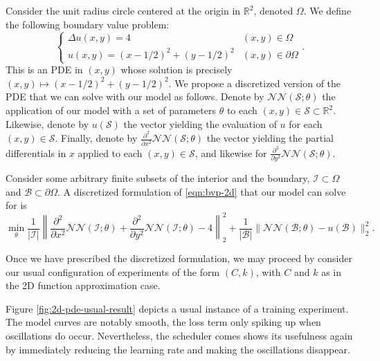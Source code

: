 \documentclass[12pt]{report} %
\begin{document}
Consider the unit radius circle centered at the origin in $\mathbb{R}^2$,
denoted $\Omega$. We define the following boundary value problem:
\begin{equation}
  \left\{\begin{array}{ll}
    \Delta u (x, y) = 4                      & (x, y) \in \Omega          \\
    u (x, y) = (x - 1 / 2)^2 + (y - 1 / 2)^2 & (x, y) \in \partial \Omega
  \end{array}\right. . \label{eqn:bvp-2d}
\end{equation}
This is an PDE in $(x, y)$ whose solution is precisely $(x, y) \mapsto (x - 1
  / 2)^2 + (y - 1 / 2)^2$. We propose a discretized version of the PDE that we
can solve with our model as follows. Denote by $\mathcal{N}\mathcal{N}
  (\mathcal{S}; \theta)$ the application of our model with a set of parameters
$\theta$ to each $(x, y) \in \mathcal{S} \subset \mathbb{R}^2$. Likewise,
denote by $u (\mathcal{S})$ the vector yielding the evaluation of $u$ for each
$(x, y) \in \mathcal{S}$. Finally, denote by $\frac{\partial^2}{\partial x^2}
  \mathcal{N}\mathcal{N} (\mathcal{S}; \theta)$ the vector yielding the partial
differentials in $x$ applied to each $(x, y) \in \mathcal{S}$, and likewise
for $\frac{\partial^2}{\partial y^2} \mathcal{N}\mathcal{N} (\mathcal{S};
  \theta)$.

Consider some arbitrary finite subsets of the interior and the boundary,
$\mathcal{I} \subset \Omega$ and $\mathcal{B} \subset \partial \Omega$. A
discretized formulation of \eqref{eqn:bvp-2d} that our model can solve for is
\[ \min_{\theta} \frac{1}{| \mathcal{I} |} \left\| \frac{\partial^2}{\partial
    x^2} \mathcal{N}\mathcal{N} (\mathcal{I}; \theta) +
  \frac{\partial^2}{\partial y^2} \mathcal{N}\mathcal{N} (\mathcal{I};
  \theta) - 4 \right\|_2^2 + \frac{1}{| \mathcal{B} |} \|
  \mathcal{N}\mathcal{N} (\mathcal{B}; \theta) - u (\mathcal{B}) \|_2^2 . \]

Once we have prescribed the discretized formulation, we may proceed by consider our usual configuration of experiments of the form $(C,k)$, with $C$ and $k$ as in the 2D function approximation case.

Figure \ref{fig:2d-pde-usual-result} depicts a usual instance of a training experiment. The model curves are notably smooth, the loss term only spiking up when oscillations do occur. Nevertheless, the scheduler comes shows its usefulness again by immediately reducing the learning rate and making the oscillations disappear.
\end{document}
